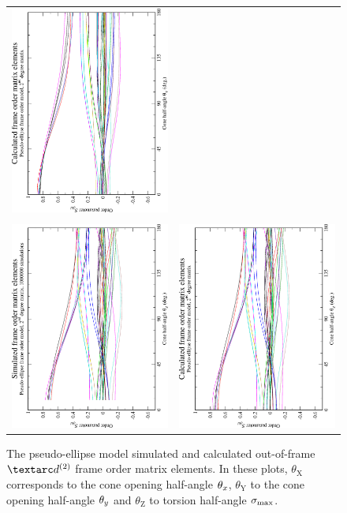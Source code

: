 \begin{figure}
\begin{tabular}{@{}cc@{}}
    \includegraphics[width=.35\textwidth,angle=270]{images/frame_order_matrix/Sijkl_pseudo-ellipse_out_of_frame_theta_y_calc.eps} \\
    \\[-5pt]
    \includegraphics[width=.35\textwidth,angle=270]{images/frame_order_matrix/Sijkl_pseudo-ellipse_out_of_frame_theta_z_ens1000000.eps} &
    \includegraphics[width=.35\textwidth,angle=270]{images/frame_order_matrix/Sijkl_pseudo-ellipse_out_of_frame_theta_z_calc.eps} \\
  \end{tabular}
  \caption[Pseudo-ellipse simulated and calculated out-of-frame $\FOtwo$ elements.]{
    The pseudo-ellipse model simulated and calculated out-of-frame $\FOtwo$ frame order matrix elements.
    In these plots, $\theta_\textrm{X}$ corresponds to the cone opening half-angle $\theta_x$, $\theta_\textrm{Y}$ to the cone opening half-angle $\theta_y$ and $\theta_\textrm{Z}$ to torsion half-angle $\sigma_\textrm{max}$.
}
\end{figure}
